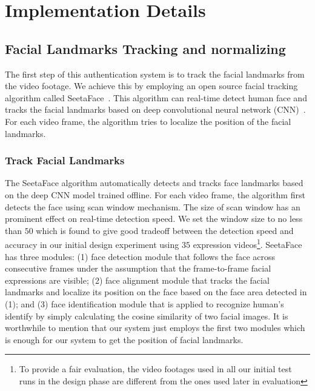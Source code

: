 \section{Implementation Details}
    \subsection{Facial Landmarks Tracking and normalizing}
        The first step of this authentication system is to track the facial landmarks from the video footage. We achieve this by employing an open source facial tracking algorithm called SeetaFace~\cite{SeetaFace-toolbox-web}. This algorithm can real-time detect human face and tracks the facial landmarks based on deep convolutional neural network (CNN)~\cite{Krizhevsky2012ImageNet}. For each video frame, the algorithm tries to localize the position of the facial landmarks.
        \subsubsection{Track Facial Landmarks}
            The SeetaFace algorithm automatically detects and tracks face landmarks based on the deep CNN model trained offline. For each video frame, the algorithm first detects the face using scan window mechanism. The size of scan window has an prominent effect on real-time detection speed. We set the window size to no less than $50$ which is found to give good tradeoff between the detection speed and accuracy in our initial design experiment using $35$ expression videos\footnote{To provide a fair evaluation, the video footages used in all our initial test runs in the design phase are different from the ones used later in evaluation}. SeetaFace has three modules: (1) face detection module that follows the face across consecutive frames under the assumption that the frame-to-frame facial expressions are visible; (2) face alignment module that tracks the facial landmarks and localize its position on the face based on the face area detected in (1); and (3) face identification module that is applied to recognize human's identify by simply calculating the cosine similarity of two facial images. It is worthwhile to mention that our system just employs the first two modules which is enough for our system to get the position of facial landmarks.

